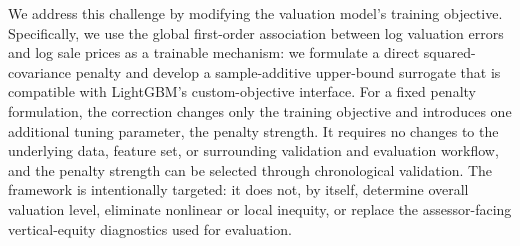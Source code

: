 \documentclass[10pt]{article}
\theoremstyle{definition}
\newcommand{\1}{\mathbf{1}}
\begin{document}

{We address this challenge by modifying the valuation model's training objective. Specifically, we use the global first-order association between log valuation errors and log sale prices as a trainable mechanism: we formulate a direct squared-covariance penalty and develop a sample-additive upper-bound surrogate that is compatible with LightGBM's custom-objective interface. For a fixed penalty formulation, the correction changes only the training objective and introduces one additional tuning parameter, the penalty strength. It requires no changes to the underlying data, feature set, or surrounding validation and evaluation workflow, and the penalty strength can be selected through chronological validation. The framework is intentionally targeted: it does not, by itself, determine overall valuation level, eliminate nonlinear or local inequity, or replace the assessor-facing vertical-equity diagnostics used for evaluation.}
\end{document}
